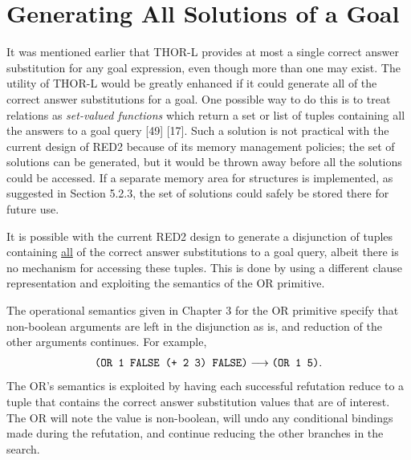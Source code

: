 \section{Generating All Solutions of a Goal}

It was mentioned earlier that THOR-L provides at most a single correct answer
substitution for any goal expression, even though more than one may exist. The
utility of THOR-L would be greatly enhanced if it could generate all of the
correct answer substitutions for a goal. One possible way to do this is to treat
relations as \emph{set-valued functions} which return a set or list of tuples
containing all the answers to a goal query [49] [17]. Such a solution is not
practical with the current design of RED2 because of its memory management
policies; the set of solutions can be generated, but it would be thrown away
before all the solutions could be accessed. If a separate memory area for
structures is implemented, as suggested in Section 5.2.3, the set of solutions
could safely be stored there for future use.

It is possible with the current RED2 design to generate a disjunction of tuples
containing \underline{all} of the correct answer substitutions to a goal query, albeit there
is no mechanism for accessing these tuples. This is done by using a different
clause representation and exploiting the semantics of the OR primitive.

The operational semantics given in Chapter 3 for the OR primitive specify that
non-boolean arguments are left in the disjunction as is, and reduction of the
other arguments continues. For example,
\[
\texttt{(OR 1 FALSE (+ 2 3) FALSE)}\longrightarrow\texttt{(OR 1 5)}.
\]
The OR's semantics is exploited by having each successful refutation reduce to a
tuple that contains the correct answer substitution values that are of interest.
The OR will note the value is non-boolean, will undo any conditional bindings
made during the refutation, and continue reducing the other branches in the
search.

